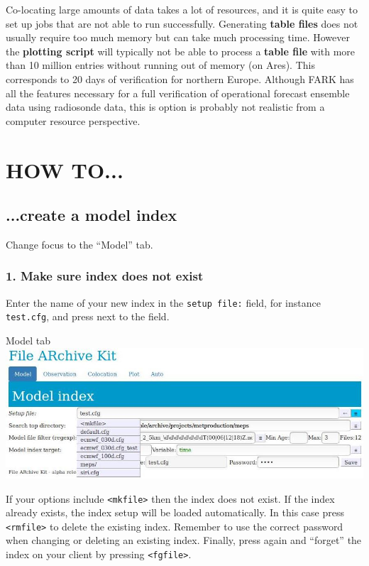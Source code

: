 \documentclass[letterpaper,10pt,twoside,twocolumn,openany]{book}
\begin{document}
Co-locating large amounts of data takes a lot of resources, and it is quite easy to
set up jobs that are not able to run successfully. Generating {\bf table files}
does not usually require too much memory but can take much processing time.
However the {\bf plotting script} will typically not be able to process a {\bf table file} with 
more than 10 million entries without running out of memory (on Ares). 
This corresponds to 20 days of verification for northern Europe.
Although FARK has all the features necessary for a full verification of
operational forecast ensemble data using radiosonde data, this is option is
probably not realistic from a computer resource perspective.

\section{HOW TO...}

\subsection{...create a model index}
Change focus to the ``Model'' tab.
\subsubsection{1. Make sure index does not exist}
Enter the name of your new index in the \lstinline!setup file:! field, for instance \lstinline!test.cfg!,
and press   next to the field.
\begin{paperbox}{Model tab}
  \includegraphics[width=\columnwidth]{how_mod.jpg}
\end{paperbox}
If your options include \lstinline!<mkfile>! then the index does not exist.
If the index already exists, the index setup will be loaded automatically.
In this case press \lstinline!<rmfile>! to delete the existing index.
Remember to use the correct password when changing or deleting an existing index.
Finally, press  again and ``forget'' the index on your client by pressing  \lstinline!<fgfile>!.
\end{document}
